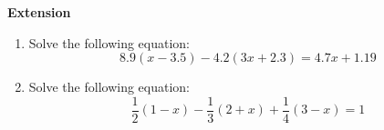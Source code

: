 \documentclass[12pt]{article}
\begin{document}
\newpage

\noindent \textbf{Extension}

\medskip

\begin{enumerate}
    \item Solve the following equation:
    \[
    8.9(x-3.5)-4.2(3x+2.3)=4.7x+1.19
    \]
    \vspace{7cm}
    \item Solve the following equation:
    \[
    \frac{1}{2}(1-x)-\frac{1}{3}(2+x)+\frac{1}{4}(3-x)=1
    \]
    
\end{enumerate}
\end{document}
